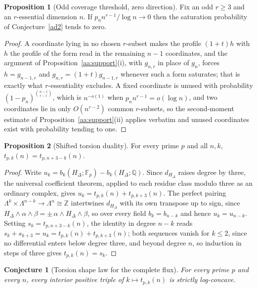 \documentclass[11pt]{article}
\newtheorem{conjecture}{Conjecture}
\theoremstyle{definition}
\newcommand{\Z}{\mathbb Z}
\providecommand{\Z}{\mathbb Z}
\newtheorem{proposition}{Proposition}
\begin{document}
\begin{proposition}[Odd coverage threshold, zero direction]\label{ad:cover}
Fix an odd $r\ge3$ and an $r$-essential dimension $n$.  If $p_nn^{r-1}/\log n\to0$ then the saturation probability of Conjecture~\ref{ad2} tends to zero.
\end{proposition}

\begin{proof}
A coordinate lying in no chosen $r$-subset makes the profile $(1+t)h$ with $h$ the profile of the form read in the remaining $n-1$ coordinates, and the argument of Proposition~\ref{aa:support}(i), with $g_{n,r}$ in place of $g_n$, forces $h=g_{n-1,r}$ and $g_{n,r}=(1+t)g_{n-1,r}$ whenever such a form saturates; that is exactly what $r$-essentiality excludes.  A fixed coordinate is unused with probability $(1-p_n)^{\binom{n-1}{r-1}}$, which is $n^{-o(1)}$ when $p_nn^{r-1}=o(\log n)$, and two coordinates lie in only $O(n^{r-2})$ common $r$-subsets, so the second-moment estimate of Proposition~\ref{aa:support}(ii) applies verbatim and unused coordinates exist with probability tending to one.
\end{proof}

\begin{proposition}[Shifted torsion duality]\label{ad:dual}
For every prime $p$ and all $n,k$, $t_{p,k}(n)=t_{p,n+3-k}(n)$.
\end{proposition}

\begin{proof}
Write $u_k=b_k(H_\Delta;\mathbb F_p)-b_k(H_\Delta;\mathbb Q)$.  Since $d_{H_\Delta}$ raises degree by three, the universal coefficient theorem, applied to each residue class modulo three as an ordinary complex, gives $u_k=t_{p,k}(n)+t_{p,k+3}(n)$.  The perfect pairing $\Lambda^k\times\Lambda^{n-k}\to\Lambda^n\cong\Z$ intertwines $d_{H_\Delta}$ with its own transpose up to sign, since $H_\Delta\wedge\alpha\wedge\beta=\pm\,\alpha\wedge H_\Delta\wedge\beta$, so over every field $b_k=b_{n-k}$ and hence $u_k=u_{n-k}$.  Setting $s_k=t_{p,n+3-k}(n)$, the identity in degree $n-k$ reads $s_k+s_{k+3}=u_k=t_{p,k}(n)+t_{p,k+3}(n)$; both sequences vanish for $k\le2$, since no differential enters below degree three, and beyond degree $n$, so induction in steps of three gives $t_{p,k}(n)=s_k$.
\end{proof}

\begin{conjecture}[Torsion shape law for the complete flux]\label{ad3}
For every prime $p$ and every $n$, every interior positive triple of $k\mapsto t_{p,k}(n)$ is strictly log-concave.
\end{conjecture}
\end{document}
